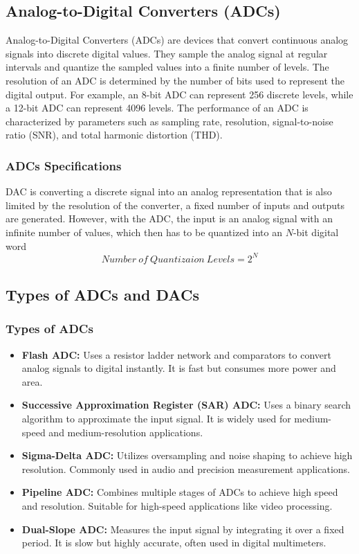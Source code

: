 \subsection{Analog-to-Digital Converters (ADCs)}
Analog-to-Digital Converters (ADCs) are devices that convert continuous analog signals into discrete digital values. They sample the analog signal at regular intervals and quantize the sampled values into a finite number of levels. The resolution of an ADC is determined by the number of bits used to represent the digital output. For example, an 8-bit ADC can represent 256 discrete levels, while a 12-bit ADC can represent 4096 levels. The performance of an ADC is characterized by parameters such as sampling rate, resolution, signal-to-noise ratio (SNR), and total harmonic distortion (THD).
\subsubsection{ADCs Specifications}
DAC is converting a discrete
signal into an analog representation that is also limited by the resolution of the converter,
a fixed number of inputs and outputs are generated. However, with the ADC, the input is
an analog signal with an infinite number of values, which then has to be quantized into an
\(N\)-bit digital word
\begin{equation}
    Number\ of\ Quantizaion\ Levels = 2^N
\end{equation}

\subsection{Types of ADCs and DACs}
\subsubsection{Types of ADCs}
\begin{itemize}
    \item \textbf{Flash ADC:} Uses a resistor ladder network and comparators to convert analog signals to digital instantly. It is fast but consumes more power and area.
    \item \textbf{Successive Approximation Register (SAR) ADC:} Uses a binary search algorithm to approximate the input signal. It is widely used for medium-speed and medium-resolution applications.
    \item \textbf{Sigma-Delta ADC:} Utilizes oversampling and noise shaping to achieve high resolution. Commonly used in audio and precision measurement applications.
    \item \textbf{Pipeline ADC:} Combines multiple stages of ADCs to achieve high speed and resolution. Suitable for high-speed applications like video processing.
    \item \textbf{Dual-Slope ADC:} Measures the input signal by integrating it over a fixed period. It is slow but highly accurate, often used in digital multimeters.
\end{itemize}


